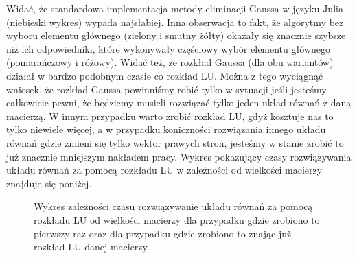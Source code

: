 \documentclass[]{article}
\begin{document}
Widać, że standardowa implementacja metody eliminacji Gaussa w języku Julia (niebieski wykres) wypada najsłabiej. Inna obserwacja to fakt, że algorytmy bez wyboru elementu głównego (zielony i smutny żółty) okazały się znacznie szybsze niż ich odpowiedniki, które wykonywały częściowy wybór elementu głównego (pomarańczowy i różowy). Widać też, ze rozkład Gaussa (dla obu wariantów) działał w bardzo podobnym czasie co rozkład LU. Można z tego wyciągnąć wniosek, że rozkład Gaussa powinniśmy robić tylko w sytuacji jeśli jesteśmy całkowicie pewni, że będziemy musieli rozwiązać tylko jeden układ równań z daną macierzą. W innym przypadku warto zrobić rozkład LU, gdyż kosztuje nas to tylko niewiele więcej, a w przypadku koniczności rozwiązania innego układu równań gdzie zmieni się tylko wektor prawych stron, jesteśmy w stanie zrobić to już znacznie mniejszym nakładem pracy. Wykres pokazujący czasy rozwiązywania układu równań za pomocą rozkładu LU w zależności od wielkości macierzy znajduje się poniżej.
\clearpage

\begin{figure}[h]
	\centering
	 \hfill
	\caption*{Wykres zależności czasu rozwiązywanie układu równań za pomocą rozkładu LU od wielkości macierzy dla przypadku gdzie zrobiono to pierwszy raz oraz dla przypadku gdzie zrobiono to znając już rozkład LU danej macierzy.}
\end{figure}
\end{document}
